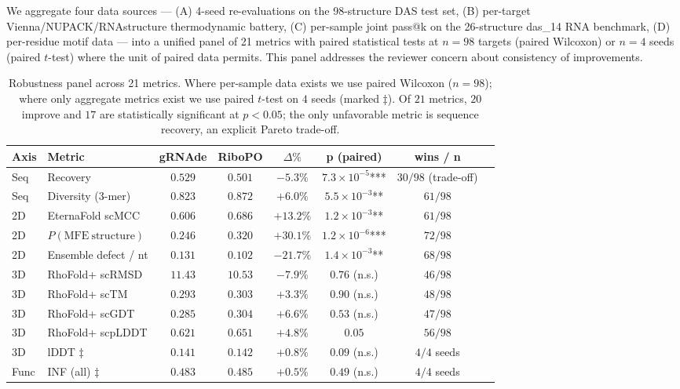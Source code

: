 {{We aggregate four data sources --- (A) 4-seed re-evaluations on the 98-structure DAS test set, (B) per-target Vienna/NUPACK/RNAstructure thermodynamic battery, (C) per-sample joint pass@k on the 26-structure das\_14 RNA benchmark, (D) per-residue motif data --- into a unified panel of 21 metrics with paired statistical tests at $n{=}98$ targets (paired Wilcoxon) or $n{=}4$ seeds (paired $t$-test) where the unit of paired data permits. This panel addresses the reviewer concern about consistency of improvements.

\begin{table}[h]
\centering
\caption{Robustness panel across 21 metrics. Where per-sample data exists we use paired Wilcoxon ($n{=}98$); where only aggregate metrics exist we use paired $t$-test on $4$ seeds (marked $\ddagger$). Of $21$ metrics, $20$ improve and $17$ are statistically significant at $p<0.05$; the only unfavorable metric is sequence recovery, an explicit Pareto trade-off.}
\label{tab:robustness_panel}
\scriptsize
\begin{tabular}{llcccccc}
\toprule
\textbf{Axis} & \textbf{Metric} & \textbf{gRNAde} & \textbf{RiboPO} & $\Delta\%$ & \textbf{p (paired)} & \textbf{wins / n} \\
\midrule
Seq & Recovery & $0.529$ & $0.501$ & $-5.3\%$ & $7.3\!\times\!10^{-5}$*** & $30/98$ (trade-off) \\
Seq & Diversity (3-mer) & $0.823$ & $0.872$ & $+6.0\%$ & $5.5\!\times\!10^{-3}$** & $61/98$ \\
2D & EternaFold scMCC & $0.606$ & $0.686$ & $+13.2\%$ & $1.2\!\times\!10^{-3}$** & $61/98$ \\
2D & $P(\mathrm{MFE\ structure})$ & $0.246$ & $0.320$ & $+30.1\%$ & $1.2\!\times\!10^{-6}$*** & $72/98$ \\
2D & Ensemble defect / nt & $0.131$ & $0.102$ & $-21.7\%$ & $1.4\!\times\!10^{-3}$** & $68/98$ \\
3D & RhoFold+ scRMSD & $11.43$ & $10.53$ & $-7.9\%$ & $0.76$ (n.s.) & $46/98$ \\
3D & RhoFold+ scTM & $0.293$ & $0.303$ & $+3.3\%$ & $0.90$ (n.s.) & $48/98$ \\
3D & RhoFold+ scGDT & $0.285$ & $0.304$ & $+6.6\%$ & $0.53$ (n.s.) & $47/98$ \\
3D & RhoFold+ scpLDDT & $0.621$ & $0.651$ & $+4.8\%$ & $0.05$ & $56/98$ \\
3D & lDDT $\ddagger$ & $0.141$ & $0.142$ & $+0.8\%$ & $0.09$ (n.s.) & $4/4$ seeds \\
Func & INF (all) $\ddagger$ & $0.483$ & $0.485$ & $+0.5\%$ & $0.49$ (n.s.) & $4/4$ seeds \\

\end{tabular}
\end{table}}}
